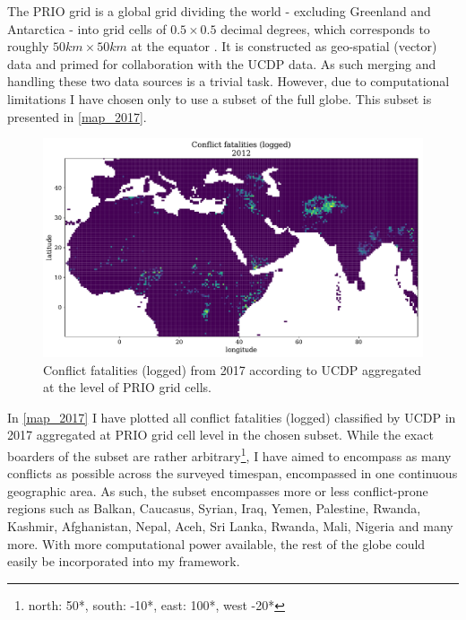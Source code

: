 \documentclass[a4paper]{article}
\begin{document}
The PRIO grid is a global grid dividing the world - excluding Greenland and Antarctica - into grid cells of $0.5 \times 0.5$ decimal degrees, which corresponds to roughly $50km\times50km$ at the equator \citep[367]{Tollefsen_2012}. It is constructed as geo-spatial (vector) data and primed for collaboration with the UCDP data. As such merging and handling these two data sources is a trivial task. However, due to computational limitations I have chosen only to use a subset of the full globe. This subset is presented in \autoref{map_2017}.\par

\begin{figure}[!htb]
	\centering
	\includegraphics[scale=0.5]{log_best_2012_samples.pdf}
    \caption{\footnotesize{Conflict fatalities (logged) from 2017 according to UCDP aggregated at the level of PRIO grid cells.}}\label{map_2017}
\end{figure}

In \autoref{map_2017} I have plotted all conflict fatalities (logged) classified by UCDP in 2017 aggregated at PRIO grid cell level in the chosen subset. While the exact boarders of the subset are rather arbitrary\footnote{north: 50*, south: -10*, east: 100*, west -20*}, I have aimed to encompass as many conflicts as possible across the surveyed timespan, encompassed in one continuous geographic area. As such, the subset encompasses more or less conflict-prone regions such as Balkan, Caucasus, Syrian, Iraq, Yemen, Palestine, Rwanda, Kashmir, Afghanistan, Nepal, Aceh, Sri Lanka, Rwanda, Mali, Nigeria and many more. With more computational power available, the rest of the globe could easily be incorporated into my framework.\par
\end{document}
